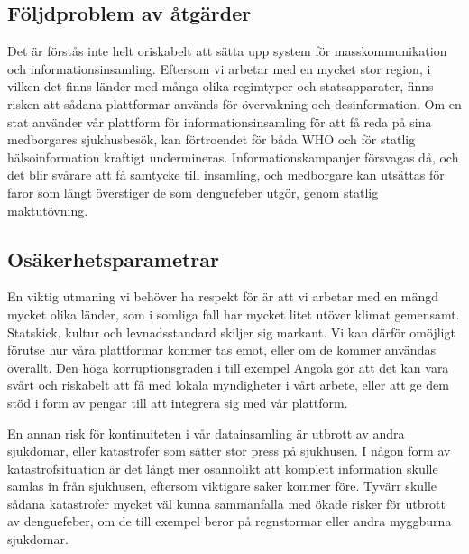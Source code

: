\documentclass{article}
\begin{document}
\subsection{Följdproblem av åtgärder}

Det är förstås inte helt oriskabelt att sätta upp system för masskommunikation och informationsinsamling. Eftersom vi arbetar med en mycket stor region, i vilken det finns länder med många olika regimtyper och statsapparater, finns risken att sådana plattformar används för övervakning och desinformation. Om en stat använder vår plattform för informationsinsamling för att få reda på sina medborgares sjukhusbesök, kan förtroendet för båda WHO och för statlig hälsoinformation kraftigt undermineras. Informationskampanjer försvagas då, och det blir svårare att få samtycke till insamling, och medborgare kan utsättas för faror som långt överstiger de som denguefeber utgör, genom statlig maktutövning.

\subsection{Osäkerhetsparametrar}

En viktig utmaning vi behöver ha respekt för är att vi arbetar med en mängd mycket olika länder, som i somliga fall har mycket litet utöver klimat gemensamt. Statskick, kultur och levnadsstandard skiljer sig markant. Vi kan därför omöjligt förutse hur våra plattformar kommer tas emot, eller om de kommer användas överallt. Den höga korruptionsgraden i till exempel Angola  gör att det kan vara svårt och riskabelt att få med lokala myndigheter i vårt arbete, eller att ge dem stöd i form av pengar till att integrera sig med vår plattform. 

En annan risk för kontinuiteten i vår datainsamling är utbrott av andra sjukdomar, eller katastrofer som sätter stor press på sjukhusen. I någon form av katastrofsituation är det långt mer osannolikt att komplett information skulle samlas in från sjukhusen, eftersom viktigare saker kommer före. Tyvärr skulle sådana katastrofer mycket väl kunna sammanfalla med ökade risker för utbrott av denguefeber, om de till exempel beror på regnstormar eller andra myggburna sjukdomar.





\end{document}
